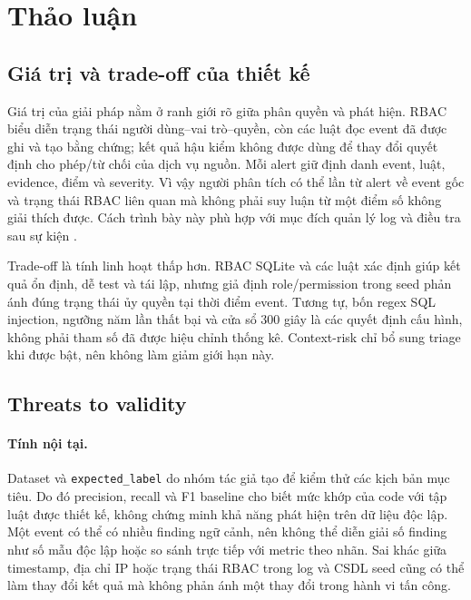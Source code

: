 \section{Thảo luận}
\label{sec:discussion}

\subsection{Giá trị và trade-off của thiết kế}

Giá trị của giải pháp nằm ở ranh giới rõ giữa phân quyền và phát hiện. RBAC
biểu diễn trạng thái người dùng--vai trò--quyền, còn các luật đọc event đã được
ghi và tạo bằng chứng; kết quả hậu kiểm không được dùng để thay đổi quyết định
cho phép/từ chối của dịch vụ nguồn. Mỗi alert giữ định danh event, luật,
evidence, điểm và severity. Vì vậy người phân tích có thể lần từ alert về event
gốc và trạng thái RBAC liên quan mà không phải suy luận từ một điểm số không giải
thích được. Cách trình bày này phù hợp với mục đích quản lý log và điều tra sau
sự kiện \cite{Kent2006SP80092}.

Trade-off là tính linh hoạt thấp hơn. RBAC SQLite và các luật xác định giúp
kết quả ổn định, dễ test và tái lập, nhưng giả định role/permission trong seed
phản ánh đúng trạng thái ủy quyền tại thời điểm event. Tương tự, bốn regex SQL
injection, ngưỡng năm lần thất bại và cửa sổ 300 giây là các quyết định cấu hình,
không phải tham số đã được hiệu chỉnh thống kê. Context-risk chỉ bổ sung triage
khi được bật, nên không làm giảm giới hạn này.

\subsection{Threats to validity}

\paragraph{Tính nội tại.} Dataset và \texttt{expected\_label} do nhóm tác giả
tạo để kiểm thử các kịch bản mục tiêu. Do đó precision, recall và F1 baseline
cho biết mức khớp của code với tập luật được thiết kế, không chứng minh khả năng
phát hiện trên dữ liệu độc lập. Một event có thể có nhiều finding ngữ cảnh, nên
không thể diễn giải số finding như số mẫu độc lập hoặc so sánh trực tiếp với
metric theo nhãn. Sai khác giữa timestamp, địa chỉ IP hoặc trạng thái RBAC trong
log và CSDL seed cũng có thể làm thay đổi kết quả mà không phản ánh một thay đổi
trong hành vi tấn công.

